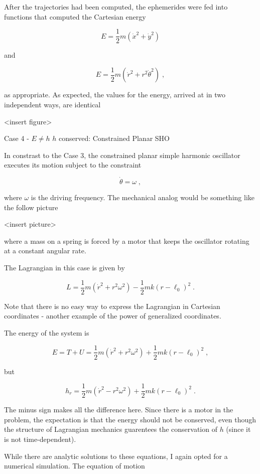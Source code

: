 \documentclass[12pt]{article}
\begin{document}
After the trajectories had been computed, the ephemerides were fed into functions that computed the Cartesian energy

\[ E = \frac{1}{2} m \left( {\dot x}^2 + {\dot y}^2 \right) \]

and

\[ E = \frac{1}{2} m \left( {\dot r}^2 + r^2 {\dot \theta}^2 \right) \; ,\]

as appropriate.  As expected, the values for the energy, arrived at in two independent ways, are identical

<insert figure>

Case 4 - $E \neq h$ $h$ conserved: Constrained Planar SHO

In constrast to the Case 3, the constrained planar simple harmonic oscillator executes its motion subject to the constraint

\[ {\dot \theta} = \omega \; ,\]

where $\omega$ is the driving frequency.  The mechanical analog would be something like the follow picture

<insert picture>

where a mass on a spring is forced by a motor that keeps the oscillator rotating at a constant angular rate.

The Lagrangian in this case is given by

\[ L = \frac{1}{2} m \left( {\dot r}^2  + r^2 \omega^2 \right) - \frac{1}{2} m k (r-\ell_0)^2 \; . \]

Note that there is no easy way to express the Lagrangian in Cartesian coordinates - another example of the power of generalized coordinates. 

The energy of the system is 

\[ E = T + U = \frac{1}{2} m \left( {\dot r}^2  + r^2 \omega^2 \right) + \frac{1}{2} m k (r-\ell_0)^2 \; ,\]

but 

\[ h_r = \frac{1}{2} m \left( {\dot r}^2  - r^2 \omega^2 \right) + \frac{1}{2} m k (r-\ell_0)^2 \; . \]  

The minus sign makes all the difference here.  Since there is a motor in the problem, the expectation is that the energy should not be conserved, even though the structure of Lagrangian mechanics guarentees the conservation of $h$ (since it is not time-dependent).   

While there are analytic solutions to these equations, I again opted for a numerical simulation.  The equation of motion 
\end{document}
